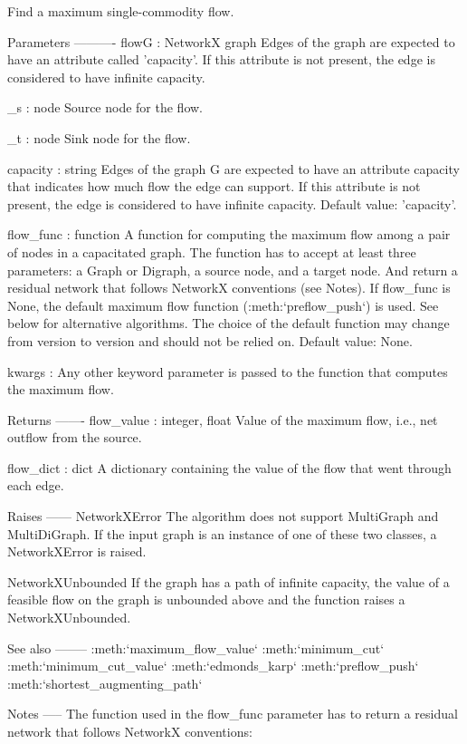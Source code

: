 \begin{DoxyVerb}Find a maximum single-commodity flow.

Parameters
----------
flowG : NetworkX graph
    Edges of the graph are expected to have an attribute called
    'capacity'. If this attribute is not present, the edge is
    considered to have infinite capacity.

_s : node
    Source node for the flow.

_t : node
    Sink node for the flow.

capacity : string
    Edges of the graph G are expected to have an attribute capacity
    that indicates how much flow the edge can support. If this
    attribute is not present, the edge is considered to have
    infinite capacity. Default value: 'capacity'.

flow_func : function
    A function for computing the maximum flow among a pair of nodes
    in a capacitated graph. The function has to accept at least three
    parameters: a Graph or Digraph, a source node, and a target node.
    And return a residual network that follows NetworkX conventions
    (see Notes). If flow_func is None, the default maximum
    flow function (:meth:`preflow_push`) is used. See below for
    alternative algorithms. The choice of the default function may change
    from version to version and should not be relied on. Default value:
    None.

kwargs : Any other keyword parameter is passed to the function that
    computes the maximum flow.

Returns
-------
flow_value : integer, float
    Value of the maximum flow, i.e., net outflow from the source.

flow_dict : dict
    A dictionary containing the value of the flow that went through
    each edge.

Raises
------
NetworkXError
    The algorithm does not support MultiGraph and MultiDiGraph. If
    the input graph is an instance of one of these two classes, a
    NetworkXError is raised.

NetworkXUnbounded
    If the graph has a path of infinite capacity, the value of a
    feasible flow on the graph is unbounded above and the function
    raises a NetworkXUnbounded.

See also
--------
:meth:`maximum_flow_value`
:meth:`minimum_cut`
:meth:`minimum_cut_value`
:meth:`edmonds_karp`
:meth:`preflow_push`
:meth:`shortest_augmenting_path`

Notes
-----
The function used in the flow_func parameter has to return a residual
network that follows NetworkX conventions:


\end{DoxyVerb}
